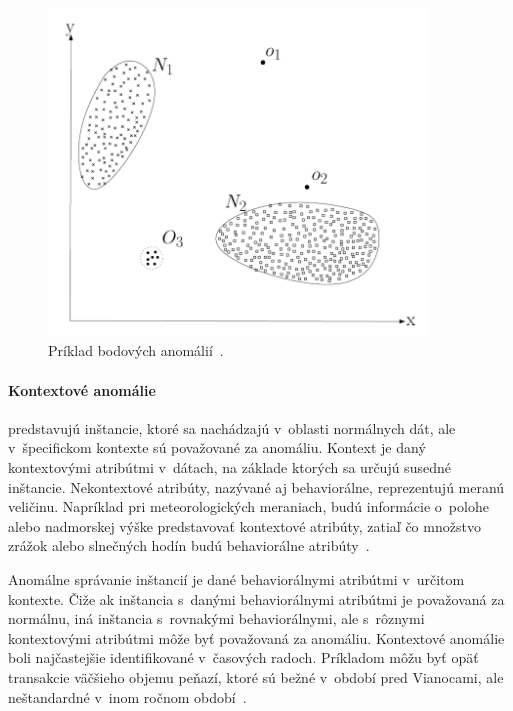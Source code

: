 \documentclass[a4paper,twoside,slovak,12pt,appendix]{article}
\begin{document}
\begin{figure}[htbp]
  \centering
  \includegraphics[width=0.9\textwidth]{point_anomalies.png}
  \caption[Príklad bodových anomálií.]{Príklad bodových anomálií~\cite{Chandola2009}.}
  \label{fig:point-anomalies}
\end{figure}

\paragraph{Kontextové anomálie} predstavujú inštancie, ktoré sa nachádzajú
v~oblasti normálnych dát, ale v~špecifickom kontexte sú považované za anomáliu.
Kontext je daný kontextovými atribútmi v~dátach, na základe ktorých sa určujú
susedné inštancie. Nekontextové atribúty, nazývané aj behaviorálne, reprezentujú
meranú veličinu. Napríklad pri meteorologických meraniach, budú informácie
o~polohe alebo nadmorskej výške predstavovať kontextové atribúty, zatiaľ čo
množstvo zrážok alebo slnečných hodín budú behaviorálne
atribúty~\cite{Chandola2009}.

Anomálne správanie inštancií je dané behaviorálnymi atribútmi v~určitom kontexte.
Čiže ak inštancia s~danými behaviorálnymi atribútmi je považovaná za normálnu,
iná inštancia s~rovnakými behaviorálnymi, ale s~rôznymi kontextovými atribútmi
môže byť považovaná za anomáliu. Kontextové anomálie boli najčastejšie
identifikované v~časových radoch. Príkladom môžu byť opäť transakcie väčšieho
objemu peňazí, ktoré sú bežné v~období pred Vianocami, ale neštandardné v~inom
ročnom období~\cite{Chandola2009}.
\end{document}
